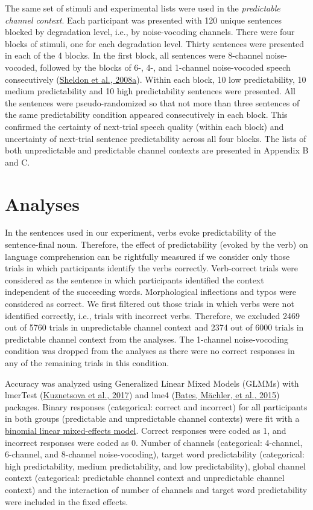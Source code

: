 \documentclass[a4paper, nobind]{templates/ociamthesis}
\begin{document}
The same set of stimuli and experimental lists were used in the \emph{predictable channel context}.
Each participant was presented with 120 unique sentences blocked by degradation level, i.e., by noise-vocoding channels.
There were four blocks of stimuli, one for each degradation level.
Thirty sentences were presented in each of the 4 blocks.
In the first block, all sentences were 8-channel noise-vocoded, followed by the blocks of 6-, 4-, and 1-channel noise-vocoded speech consecutively (\protect\hyperlink{ref-Sheldon2008a}{Sheldon et al., 2008a}).
Within each block, 10 low predictability, 10 medium predictability and 10 high predictability sentences were presented.
All the sentences were pseudo-randomized so that not more than three sentences of the same predictability condition appeared consecutively in each block.
This confirmed the certainty of next-trial speech quality (within each block) and uncertainty of next-trial sentence predictability across all four blocks.
The lists of both unpredictable and predictable channel contexts are presented in Appendix B and C.

\hypertarget{analyses-2}{%
\section{Analyses}\label{analyses-2}}

In the sentences used in our experiment, verbs evoke predictability of the sentence-final noun.
Therefore, the effect of predictability (evoked by the verb) on language comprehension can be rightfully measured if we consider only those trials in which participants identify the verbs correctly.
Verb-correct trials were considered as the sentence in which participants identified the context independent of the succeeding words.
Morphological inflections and typos were considered as correct.
We first filtered out those trials in which verbs were not identified correctly, i.e., trials with incorrect verbs.
Therefore, we excluded 2469 out of 5760 trials in unpredictable channel context and 2374 out of 6000 trials in predictable channel context from the analyses.
The 1-channel noise-vocoding condition was dropped from the analyses as there were no correct responses in any of the remaining trials in this condition.

Accuracy was analyzed using Generalized Linear Mixed Models (GLMMs) with lmerTest (\protect\hyperlink{ref-Kuznetsova2017}{Kuznetsova et al., 2017}) and lme4 (\protect\hyperlink{ref-Bates2015}{Bates, Mächler, et al., 2015}) packages.
Binary responses (categorical: correct and incorrect) for all participants in both groups (predictable and unpredictable channel contexts) were fit with a \protect\hyperlink{binomial-logistic-mixed-effects-model}{binomial linear mixed-effects model}.
Correct responses were coded as 1, and incorrect responses were coded as 0.
Number of channels (categorical: 4-channel, 6-channel, and 8-channel noise-vocoding), target word predictability (categorical: high predictability, medium predictability, and low predictability), global channel context (categorical: predictable channel context and unpredictable channel context) and the interaction of number of channels and target word predictability were included in the fixed effects.
\end{document}
